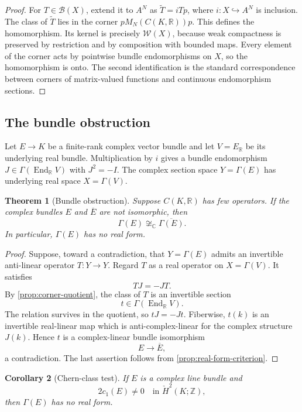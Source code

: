 \documentclass[11pt]{article}
\newtheorem{theorem}{Theorem}[section]
\newtheorem{corollary}[theorem]{Corollary}
\theoremstyle{definition}
\theoremstyle{remark}
\newcommand{\C}{\mathbb C}
\newcommand{\R}{\mathbb R}
\newcommand{\Z}{\mathbb Z}
\newcommand{\cW}{\mathcal W}
\newcommand{\cB}{\mathcal B}
\newcommand{\End}{\operatorname{End}}
\newcommand{\Hcheck}{\check H}
\begin{document}
\begin{proof}
For $T\in\cB(X)$, extend it to $A^N$ as $\widetilde T=iTp$, where $i:X\hookrightarrow A^N$ is inclusion. The class of $\widetilde T$ lies in the corner $pM_N(C(K,\R))p$. This defines the homomorphism. Its kernel is precisely $\cW(X)$, because weak compactness is preserved by restriction and by composition with bounded maps. Every element of the corner acts by pointwise bundle endomorphisms on $X$, so the homomorphism is onto. The second identification is the standard correspondence between corners of matrix-valued functions and continuous endomorphism sections.
\end{proof}

\subsection{The bundle obstruction}

Let $E\to K$ be a finite-rank complex vector bundle and let $V=E_{\R}$ be its underlying real bundle. Multiplication by $i$ gives a bundle endomorphism $J\in\Gamma(\End_{\R}V)$ with $J^2=-I$. The complex section space $Y=\Gamma(E)$ has underlying real space $X=\Gamma(V)$.

\begin{theorem}[Bundle obstruction]\label{thm:bundle-obstruction}
Suppose $C(K,\R)$ has few operators. If the complex bundles $E$ and $\overline E$ are not isomorphic, then
\[
        \Gamma(E)\not\cong_{\C}\overline{\Gamma(E)}.
\]
In particular, $\Gamma(E)$ has no real form.
\end{theorem}

\begin{proof}
Suppose, toward a contradiction, that $Y=\Gamma(E)$ admits an invertible anti-linear operator $T:Y\to Y$. Regard $T$ as a real operator on $X=\Gamma(V)$. It satisfies
\[
       TJ=-JT.
\]
By \cref{prop:corner-quotient}, the class of $T$ is an invertible section
\[
       t\in\Gamma(\End_{\R}V).
\]
The relation survives in the quotient, so $tJ=-Jt$. Fiberwise, $t(k)$ is an invertible real-linear map which is anti-complex-linear for the complex structure $J(k)$. Hence $t$ is a complex-linear bundle isomorphism
\[
       E\longrightarrow\overline E,
\]
a contradiction. The last assertion follows from \cref{prop:real-form-criterion}.
\end{proof}

\begin{corollary}[Chern-class test]\label{cor:chern-test}
If $E$ is a complex line bundle and
\[
       2c_1(E)\ne0\quad\text{in }\Hcheck^2(K;\Z),
\]
then $\Gamma(E)$ has no real form.
\end{corollary}
\end{document}
